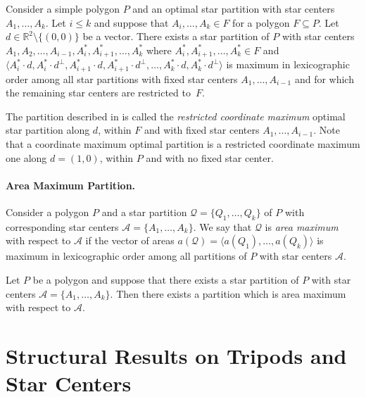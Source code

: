 \documentclass{theoretics}
\newcommand{\RR}{\mathbb{R}}
\begin{document}
\begin{lemma}\label{lem:coordmaxsubset}
Consider a simple polygon $P$ and an optimal star partition with star centers $A_1,\ldots,A_k$.
Let $i\leq k$ and suppose that $A_i,\ldots,A_k\in F$ for a polygon $F\subseteq P$. 
Let $d\in\RR^2 \setminus \{(0,0)\}$ be a vector.
There exists a star partition of $P$ with star centers $A_1,A_2,\ldots,A_{i-1},A^*_i,A^*_{i+1},\ldots,A^*_k$ where $A^*_i,A^*_{i+1},\ldots,A^*_k\in F$ and $\langle A^*_i\cdot d, A^*_i\cdot d^\perp,A^*_{i+1}\cdot d, A^*_{i+1}\cdot d^\perp,\ldots,A^*_k\cdot d,A^*_k\cdot d^\perp\rangle$ is maximum in lexicographic order among all star partitions with fixed star centers $A_1,\ldots,A_{i-1}$ and for which the remaining star centers are restricted to~$F$. 
\end{lemma}

The partition described in  is called the \emph{restricted coordinate maximum} optimal star partition along $d$, within $F$ and with fixed star centers $A_1, \dots, A_{i-1}$.
Note that a coordinate maximum optimal partition is a restricted coordinate maximum one along $d=(1,0)$, within $P$ and with no fixed star center. 


\paragraph{Area Maximum Partition.}
Consider a polygon $P$ and a star partition $\mathcal Q=\{Q_1,\ldots,Q_k\}$ of $P$ with corresponding star centers $\mathcal A=\{A_1,\ldots,A_k\}$.
We say that $\mathcal Q$ is \emph{area maximum} with respect to $\mathcal A$ if the vector of areas $a(\mathcal Q)=\langle a(Q_1),\ldots,a(Q_k)\rangle$ is maximum in lexicographic order among all partitions of $P$ with star centers $\mathcal A$.

\begin{lemma}\label{lem:areamax}
Let $P$ be a polygon and suppose that there exists a star partition of $P$ with star centers $\mathcal A=\{A_1,\ldots,A_k\}$.
Then there exists a partition which is area maximum with respect to $\mathcal A$.
\end{lemma}



\section{Structural Results on Tripods and Star Centers}
\label{sec:structure}
\end{document}
